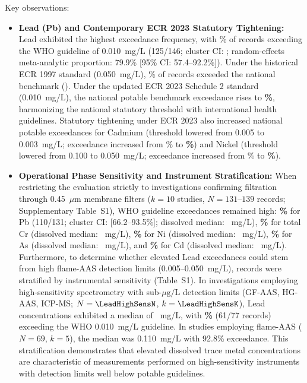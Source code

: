 \documentclass[authoryear,preprint,12pt]{elsarticle}
\begin{document}
Key observations:
\begin{itemize}
    \item \textbf{Lead (Pb) and Contemporary ECR 2023 Statutory Tightening:} Lead exhibited the highest exceedance frequency, with \LeadWhoExceedPct\% of records exceeding the WHO guideline of 0.010~mg/L (125/146; cluster CI: \LeadWhoClusterCi; random-effects meta-analytic proportion: 79.9\% [95\% CI: 57.4--92.2\%]). Under the historical ECR 1997 standard (0.050~mg/L), \LeadBdNineteenNinetySevenExceedPct\% of records exceeded the national benchmark (\LeadBdClusterCi). Under the updated ECR 2023 Schedule 2 standard (0.010~mg/L), the national potable benchmark exceedance rises to \textbf{\LeadBdTwentyTwentyThreeExceedPct\%}, harmonizing the national statutory threshold with international health guidelines. Statutory tightening under ECR 2023 also increased national potable exceedances for Cadmium (threshold lowered from 0.005 to 0.003~mg/L; exceedance increased from \CadmiumBdNineteenNinetySevenExceedPct\% to \textbf{\CadmiumBdTwentyTwentyThreeExceedPct\%}) and Nickel (threshold lowered from 0.100 to 0.050~mg/L; exceedance increased from \NickelBdNineteenNinetySevenExceedPct\% to \textbf{\NickelBdTwentyTwentyThreeExceedPct\%}).
    \item \textbf{Operational Phase Sensitivity and Instrument Stratification:} When restricting the evaluation strictly to investigations confirming filtration through 0.45~$\mu\text{m}$ membrane filters ($k=10$ studies, $N=131$--$139$ records; Supplementary Table~S1), WHO guideline exceedances remained high: \textbf{\LeadConfirmedDissolvedWhoPct\%} for Pb (110/131; cluster CI: [66.2--93.5\%]; dissolved median: \LeadConfirmedDissolvedMedian~mg/L), \textbf{\ChromiumConfirmedDissolvedWhoPct\%} for total Cr (dissolved median: \ChromiumConfirmedDissolvedMedian~mg/L), \textbf{\NickelConfirmedDissolvedWhoPct\%} for Ni (dissolved median: \NickelConfirmedDissolvedMedian~mg/L), \textbf{\ArsenicConfirmedDissolvedWhoPct\%} for As (dissolved median: \ArsenicConfirmedDissolvedMedian~mg/L), and \textbf{\CadmiumConfirmedDissolvedWhoPct\%} for Cd (dissolved median: \CadmiumConfirmedDissolvedMedian~mg/L). Furthermore, to determine whether elevated Lead exceedances could stem from high flame-AAS detection limits (0.005--0.050~mg/L), records were stratified by instrumental sensitivity (Table~S1). In investigations employing high-sensitivity spectrometry with sub-$\mu\text{g/L}$ detection limits (GF-AAS, HG-AAS, ICP-MS; $N=\LeadHighSensN$, $k=\LeadHighSensK$), Lead concentrations exhibited a median of \LeadHighSensMedian~mg/L, with \textbf{\LeadHighSensExceedPct\%} (61/77 records) exceeding the WHO 0.010~mg/L guideline. In studies employing flame-AAS ($N=69$, $k=5$), the median was 0.110~mg/L with 92.8\% exceedance. This stratification demonstrates that elevated dissolved trace metal concentrations are characteristic of measurements performed on high-sensitivity instruments with detection limits well below potable guidelines.

\end{itemize}
\end{document}

